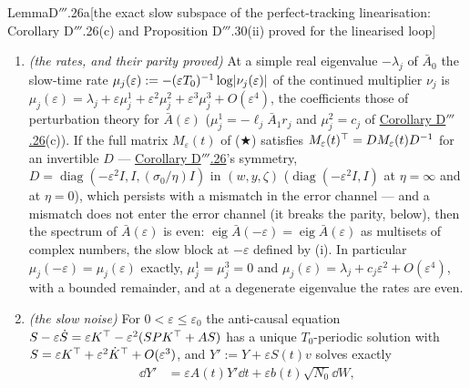 \begin{thm}{Lemma}{D$'''$.26a}[the exact slow subspace of the perfect-tracking linearisation: Corollary D$'''$.26(c)
and Proposition D$'''$.30(ii) proved for the linearised loop]
\begin{enumerate}[label=\textup{(\roman*)}]
    $\varepsilon T_0\norm{A}_\infty < \pi$, a sufficient form of Moan--Niesen's
    $\int_0^{T_0}\norm{\varepsilon A}_2 < \pi$ (\cite{S59}). The averaged generator of
    \hyperref[res:thmDppp:26]{Corollary D$'''$.26}(c)'s near-identity averaging, carried there to $\bar A_2$, is
    conjugate to $\bar A(\varepsilon)$ up to $O(\varepsilon^3)$ --- a conjugate generator, with the same eigenvalues
    to that order; its coefficients differ from $\bar A(\varepsilon)$'s Taylor coefficients by commutators with
    $\bar A_0$.
  \item \emph{(the rates, and their parity proved)} At a simple real eigenvalue $-\lambda_j$ of $\bar A_0$ the
    slow-time rate $\mu_j(\varepsilon) := -(\varepsilon T_0)^{-1}\log\lvert \nu_j(\varepsilon)\rvert$ of the continued
    multiplier $\nu_j$ is $\mu_j(\varepsilon) = \lambda_j + \varepsilon\mu_j^1 + \varepsilon^2\mu_j^2
    + \varepsilon^3\mu_j^3 + O(\varepsilon^4)$, the coefficients those of perturbation theory for
    $\bar A(\varepsilon)$ ($\mu_j^1 = -\ell_j\bar A_1r_j$ and $\mu_j^2 = c_j$ of
    \hyperref[res:thmDppp:26]{Corollary D$'''$.26}(c)). If the full matrix $M_\varepsilon(t)$ of
    \textup{($\bigstar$)} satisfies $M_\varepsilon(t)^\top = DM_\varepsilon(t)D^{-1}$ for an invertible $D$ ---
    \hyperref[res:thmDppp:26]{Corollary D$'''$.26}'s symmetry,
    $D = \operatorname{diag}(-\varepsilon^2I,I,(\sigma_0/\eta)I)$ in $(w,y,\zeta)$
    ($\operatorname{diag}(-\varepsilon^2I,I)$ at $\eta = \infty$ and at $\eta = 0$), which persists with a mismatch in
    the error channel --- and a mismatch does not enter the error channel (it breaks the parity, below), then the
    spectrum of $\bar A(\varepsilon)$ is even: $\operatorname{eig}\bar A(-\varepsilon)
    = \operatorname{eig}\bar A(\varepsilon)$ as multisets of complex numbers, the slow block at $-\varepsilon$ defined
    by (i). In particular $\mu_j(-\varepsilon) = \mu_j(\varepsilon)$ exactly, $\mu_j^1 = \mu_j^3 = 0$ and
    $\mu_j(\varepsilon) = \lambda_j + c_j\varepsilon^2 + O(\varepsilon^4)$, with a bounded remainder, and at a
    degenerate eigenvalue the rates are even.
  \item \emph{(the slow noise)} For $0 < \varepsilon\le\varepsilon_0$ the anti-causal equation
    $S - \varepsilon\dot S = \varepsilon K^\top - \varepsilon^2(SPK^\top + AS)$ has a unique $T_0$-periodic solution with
    $S = \varepsilon K^\top + \varepsilon^2\dot K^\top + O(\varepsilon^3)$, and $Y' := Y + \varepsilon S(t)v$ solves
    exactly
    \begin{align*}
      \dd Y' &= \varepsilon A(t)Y'\dd t + \varepsilon b(t)\sqrt{N_0}\dd W,\\

\end{align*}
\end{enumerate}
\end{thm}
